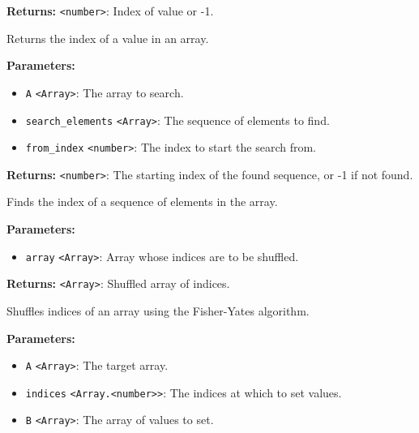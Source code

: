 \documentclass[12pt,a4paper]{article}
\begin{document}
\noindent \textbf{Returns:} \texttt{<number>}: Index of value or -1.

\noindent Returns the index of a value in an array.

\vspace{5mm}
\noindent {}


\noindent \textbf{Parameters:}
\begin{itemize}
  \item \texttt{A} \texttt{<Array>}: The array to search.
  \item \texttt{search\_elements} \texttt{<Array>}: The sequence of elements to find.
  \item \texttt{from\_index} \texttt{<number>}: The index to start the search from.
\end{itemize}

\noindent \textbf{Returns:} \texttt{<number>}: The starting index of the found sequence, or -1 if not found.

\noindent Finds the index of a sequence of elements in the array.

\vspace{5mm}
\noindent {}


\noindent \textbf{Parameters:}
\begin{itemize}
  \item \texttt{array} \texttt{<Array>}: Array whose indices are to be shuffled.
\end{itemize}

\noindent \textbf{Returns:} \texttt{<Array>}: Shuffled array of indices.

\noindent Shuffles indices of an array using the Fisher-Yates algorithm.

\vspace{5mm}
\noindent {}


\noindent \textbf{Parameters:}
\begin{itemize}
  \item \texttt{A} \texttt{<Array>}: The target array.
  \item \texttt{indices} \texttt{<Array.<number>>}: The indices at which to set values.
  \item \texttt{B} \texttt{<Array>}: The array of values to set.
\end{itemize}
\end{document}
